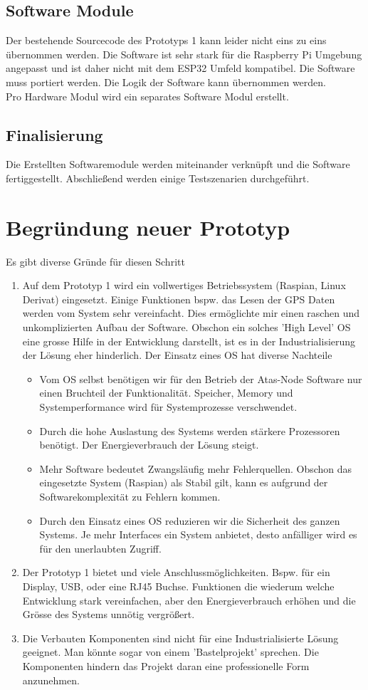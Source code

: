 \documentclass[11pt,english,german]{report}
\theoremstyle{definition}
\begin{document}
\subsection{Software Module}
Der bestehende Sourcecode des Prototyps 1 kann leider nicht eins zu eins übernommen werden. Die Software ist sehr stark für die Raspberry Pi Umgebung angepasst und ist daher nicht mit dem ESP32 Umfeld kompatibel. Die Software muss portiert werden. Die Logik der Software kann übernommen werden.\\[0.3cm]
Pro Hardware Modul wird ein separates Software Modul erstellt.

\subsection{Finalisierung}
Die Erstellten Softwaremodule werden miteinander verknüpft und die Software fertiggestellt. Abschließend werden einige Testszenarien durchgeführt. 

\newpage
\section{Begründung neuer Prototyp}
Es gibt diverse Gründe für diesen Schritt
\begin{enumerate}
	\item Auf dem Prototyp 1 wird ein vollwertiges Betriebssystem (Raspian, Linux Derivat) eingesetzt. Einige Funktionen bspw. das Lesen der GPS Daten werden vom System sehr vereinfacht. Dies ermöglichte mir einen raschen und unkomplizierten Aufbau der Software. Obschon ein solches 'High Level' OS eine grosse Hilfe in der Entwicklung darstellt, ist es in der Industrialisierung der Lösung eher hinderlich. Der Einsatz eines OS hat diverse Nachteile
	\begin{itemize}
		\item Vom OS selbst benötigen wir für den Betrieb der Atas-Node Software nur einen Bruchteil der Funktionalität. Speicher, Memory und Systemperformance wird für Systemprozesse verschwendet. 
		\item Durch die hohe Auslastung des Systems werden stärkere Prozessoren benötigt. Der Energieverbrauch der Lösung steigt.
		\item Mehr Software bedeutet Zwangsläufig mehr Fehlerquellen. Obschon das eingesetzte System (Raspian) als Stabil gilt, kann es aufgrund der Softwarekomplexität zu Fehlern kommen.
		\item Durch den Einsatz eines OS reduzieren wir die Sicherheit des ganzen Systems. Je mehr Interfaces ein System anbietet, desto anfälliger wird es für den unerlaubten Zugriff.
	\end{itemize}
	\item Der Prototyp 1 bietet und viele Anschlussmöglichkeiten. Bspw. für ein Display, USB, oder eine RJ45 Buchse. Funktionen die wiederum welche Entwicklung stark vereinfachen, aber den Energieverbrauch erhöhen und die Grösse des Systems unnötig vergrößert. 
	\item Die Verbauten Komponenten sind nicht für eine Industrialisierte Lösung geeignet. Man könnte sogar von einem 'Bastelprojekt' sprechen. Die Komponenten hindern das Projekt daran eine professionelle Form anzunehmen.
\end{enumerate}
\newpage
\end{document}
